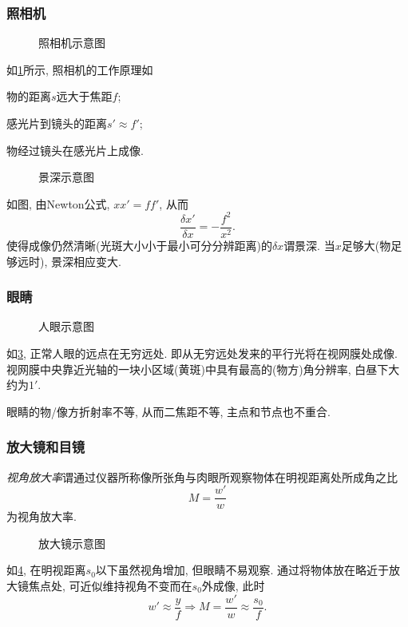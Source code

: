 \documentclass{ctexart}
\begin{document}

\subsubsection{照相机} %
\label{ssub:照相机}

\begin{figure}[ht]
    \centering
    \caption{照相机示意图}
    \label{fig:照相机示意图}
\end{figure}
如\cref{fig:照相机示意图}所示, 照相机的工作原理如
\begin{cenum}
    \item 物的距离$s$远大于焦距$f$;
    \item 感光片到镜头的距离$s'\approx f'$;
    \item 物经过镜头在感光片上成像.
\end{cenum}
\begin{figure}[ht]
    \centering
    \caption{景深示意图}
    \label{fig:景深示意图}
\end{figure}
如图, 由Newton公式, $xx' = ff'$, 从而
\[ \frac{\delta x'}{\delta x} = -\frac{f^2}{x^2}. \]
使得成像仍然清晰(光斑大小小于最小可分分辨距离)的$\delta x$谓景深. 当$x$足够大(物足够远时), 景深相应变大.


\subsubsection{眼睛} %
\label{ssub:眼睛}

\begin{figure}[ht]
    \centering
    \caption{人眼示意图}
    \label{fig:人眼示意图}
\end{figure}
如\cref{fig:人眼示意图}, 正常人眼的远点在无穷远处. 即从无穷远处发来的平行光将在视网膜处成像. 视网膜中央靠近光轴的一块小区域(黄斑)中具有最高的(物方)角分辨率, 白昼下大约为$1'$.
\par
眼睛的物/像方折射率不等, 从而二焦距不等, 主点和节点也不重合.


\subsubsection{放大镜和目镜} %
\label{ssub:放大镜和目镜}

\emph{视角放大率}谓通过仪器所称像所张角与肉眼所观察物体在明视距离处所成角之比
\[ M = \frac{w'}{w} \]
为视角放大率.
\begin{figure}[ht]
    \centering
    \caption{放大镜示意图}
    \label{fig:放大镜示意图}
\end{figure}
如\cref{fig:放大镜示意图}, 在明视距离$s_0$以下虽然视角增加, 但眼睛不易观察. 通过将物体放在略近于放大镜焦点处, 可近似维持视角不变而在$s_0$外成像, 此时
\[ w' \approx \frac{y}{f} \Rightarrow M = \frac{w'}{w} \approx \frac{s_0}{f}. \]
\end{document}
